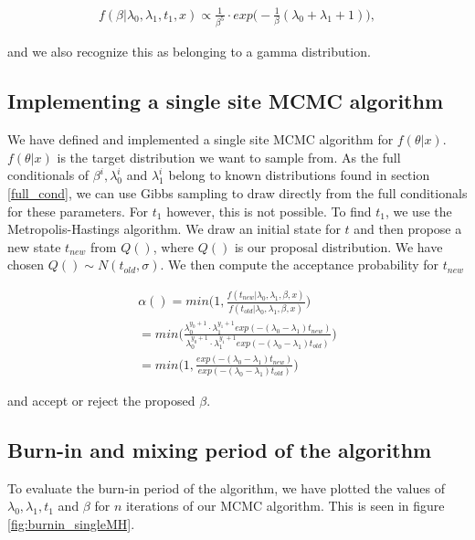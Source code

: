 \begin{align}
    f(\beta | \lambda_0, \lambda_1, t_1, x) \propto 
    \frac{1}{\beta^5} \cdot exp \Big( -\frac{1}{\beta}(\lambda_0 + \lambda_1 + 1) \Big),
\end{align}

and we also recognize this as belonging to a gamma distribution. 

\subsection{Implementing a single site MCMC algorithm}

We have defined and implemented a single site MCMC algorithm for $f(\theta |x)$. $f(\theta|x)$ is the target distribution we want to sample from.  As the full conditionals of $\beta^i, \lambda_0^i$ and $\lambda_1^i$ belong to known distributions found in section \ref{full_cond}, we can use Gibbs sampling to draw directly from the full conditionals for these parameters. For $t_1$ however, this is not possible.
To find $t_1$, we use the Metropolis-Hastings algorithm. We draw an initial state for $t$ and then propose a new state $t_{new}$ from $Q()$, where $Q()$ is our proposal distribution. We have chosen $Q() \sim N(t_{old}, \sigma)$. We then compute the acceptance probability for $t_{new}$

\begin{align}
    \alpha() = min \Big( 1, \frac{f(t_{new}| \lambda_0, \lambda_1, \beta, x)}{f(t_{old}| \lambda_0, \lambda_1, \beta, x)} \Big) \nonumber \\ 
    = min \Big( \frac{\lambda_0^{y_0 + 1} \cdot \lambda_1^{y_1 + 1} exp(-(\lambda_0 - \lambda_1)t_{new})}{\lambda_0^{y_0 + 1} \cdot \lambda_1^{y_1 + 1} exp(-(\lambda_0 - \lambda_1)t_{old})} \Big) \nonumber \\
    = min \Big( 1, \frac{exp(-(\lambda_0 - \lambda_1)t_{new})}{exp(-(\lambda_0 - \lambda_1)t_{old})} \Big)
\end{align}




and accept or reject the proposed $\beta$. 


\subsection{Burn-in and mixing period of the algorithm}

To evaluate the burn-in period of the algorithm, we have plotted the values of $\lambda_0, \lambda_1, t_1$ and $\beta$ for $n$ iterations of our MCMC algorithm. This is seen in figure \ref{fig:burnin_singleMH}. 


